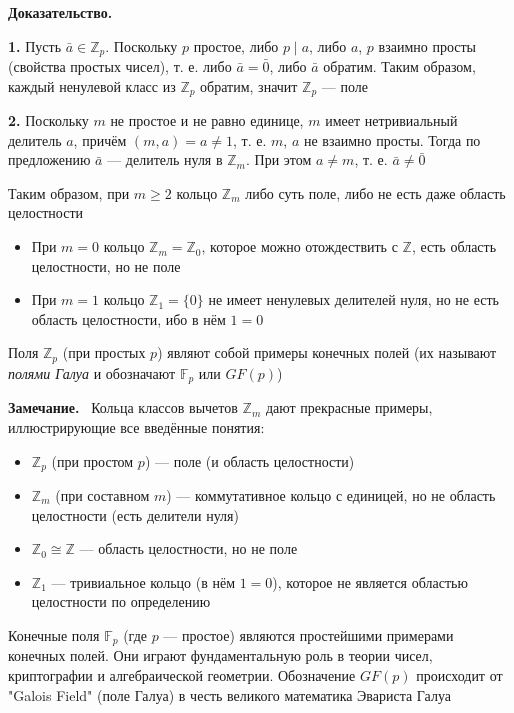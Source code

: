 \documentclass[a4paper,12pt]{article}
\newcommand{\myremark}{\textbf{Замечание.}\ }
\theoremstyle{definition}
\theoremstyle{plain}
\theoremstyle{remark}
\begin{document}
	\medskip
	\noindent \textbf{Доказательство.}
	
	\textbf{1.} Пусть $\bar{a} \in \mathbb{Z}_p$. Поскольку $p$ простое, либо $p \mid a$, либо $a$, $p$ взаимно просты (свойства простых чисел), т. е. либо $\bar{a} = \bar{0}$, либо $\bar{a}$ обратим. Таким образом, каждый ненулевой класс из $\mathbb{Z}_p$ обратим, значит $\mathbb{Z}_p$ — поле
	
	\textbf{2.} Поскольку $m$ не простое и не равно единице, $m$ имеет нетривиальный делитель $a$, причём $(m, a) = a \neq 1$, т. е. $m$, $a$ не взаимно просты. Тогда по предложению $\bar{a}$ — делитель нуля в $\mathbb{Z}_m$. При этом $a \neq m$, т. е. $\bar{a} \neq \bar{0}$
	
	\begin{tcolorbox}[colback=blue!5, colframe=blue!40!black, title=Итоговая классификация $\mathbb{Z}_m$]
		Таким образом, при $m \geq 2$ кольцо $\mathbb{Z}_m$ либо суть поле, либо не есть даже область целостности
		\begin{itemize}
			\item При $m = 0$ кольцо $\mathbb{Z}_m = \mathbb{Z}_0$, которое можно отождествить с $\mathbb{Z}$, есть область целостности, но не поле
			\item При $m = 1$ кольцо $\mathbb{Z}_1 = \{0\}$ не имеет ненулевых делителей нуля, но не есть область целостности, ибо в нём $1 = 0$
		\end{itemize}
		Поля $\mathbb{Z}_p$ (при простых $p$) являют собой примеры конечных полей (их называют \textit{полями Галуа} и обозначают $\mathbb{F}_p$ или $GF(p)$)
	\end{tcolorbox}
	
	\myremark
	Кольца классов вычетов $\mathbb{Z}_m$ дают прекрасные примеры, иллюстрирующие все введённые понятия:
	\begin{itemize}
		\item $\mathbb{Z}_p$ (при простом $p$) — поле (и область целостности)
		\item $\mathbb{Z}_m$ (при составном $m$) — коммутативное кольцо с единицей, но не область целостности (есть делители нуля)
		\item $\mathbb{Z}_0 \cong \mathbb{Z}$ — область целостности, но не поле
		\item $\mathbb{Z}_1$ — тривиальное кольцо (в нём $1 = 0$), которое не является областью целостности по определению
	\end{itemize}
	
	\begin{tcolorbox}[colback=purple!5, colframe=purple!50!black, title=Заметочка: Поля Галуа]
		Конечные поля $\mathbb{F}_p$ (где $p$ — простое) являются простейшими примерами конечных полей. Они играют фундаментальную роль в теории чисел, криптографии и алгебраической геометрии. Обозначение $GF(p)$ происходит от "Galois Field" (поле Галуа) в честь великого математика Эвариста Галуа
	\end{tcolorbox}
	
\end{document}
